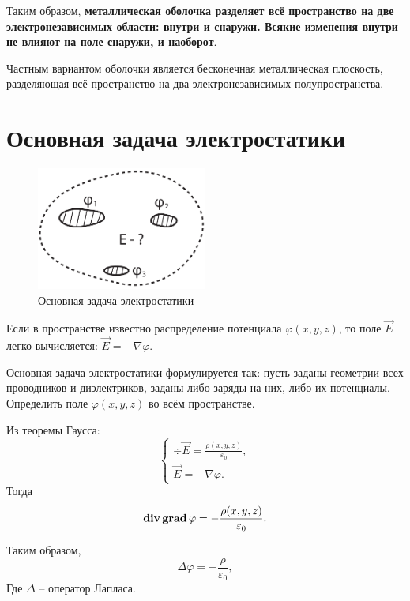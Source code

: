     Таким образом, \textbf{металлическая оболочка разделяет всё пространство
    на две электронезависимых области: внутри и снаружи. Всякие изменения
    внутри не влияют на поле снаружи, и наоборот}.

    Частным вариантом оболочки является бесконечная металлическая плоскость, 
    разделяющая всё пространство на два электронезависимых полупространства.

\section{Основная задача электростатики}

    \begin{figure}[t!]
        \center
        \includegraphics[width=0.5\textwidth]{lec04/E_from_phi.pdf}
        \caption{Основная задача электростатики}
    \end{figure}

    Если в пространстве известно распределение потенциала
    \( \varphi(x, y, z) \), то поле \( \vec{E} \) легко вычисляется:
    \( \vec{E} = -\nabla\varphi \).

    Основная задача электростатики формулируется так: пусть заданы геометрии
    всех проводников и диэлектриков, заданы либо заряды на них, либо их
    потенциалы. Определить поле \( \varphi(x, y, z) \) во всём пространстве.

    \begin{solution}
        Из теоремы Гаусса:
        \[
            \left\{
            \begin{array}{l}
                \div{\vec{E}} = \frac{\rho(x, y, z)}{\varepsilon_0}, \\
                \vec{E} = -\nabla\varphi.
            \end{array} \right.
        \]
        Тогда
        \[
            \mathbf{div\,}\mathbf{grad\,}\varphi = -\frac{\rho(x, y, z)}{\varepsilon_0}.
        \]

        Таким образом,
        \begin{equation}
            \label{eq4:1}
            \Delta\varphi = -\frac{\rho}{\varepsilon_0},
        \end{equation}
        Где \( \Delta \) -- оператор Лапласа.
    \end{solution}


